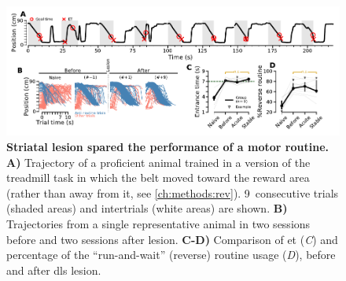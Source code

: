\begin{figure}[bt!]
	\begin{center}
		\includegraphics[width=\textwidth]{ch-lesion/figures/ReverseTreadmill.pdf}
		\caption[Preserved Motor Routine Performance After Lesion]
		{\textbf{Striatal lesion spared the performance of a motor routine.}
		\textbf{A)}
		Trajectory of a proficient animal trained in a version of the treadmill task in which the belt moved toward the reward area (rather than away from it, see \autoref{ch:methods:rev}).
		9~consecutive trials (shaded areas) and intertrials (white areas) are shown.
		\textbf{B)}
		Trajectories from a single representative animal in two sessions before and two sessions after lesion.
		\textbf{C-D)}
		Comparison of \gls{et} (\textit{C}) and percentage of the ``run-and-wait'' (reverse) routine usage (\textit{D}), before and after \gls{dls} lesion.
		}
		\label{fig:lesion:rev}
	\end{center}
\end{figure}